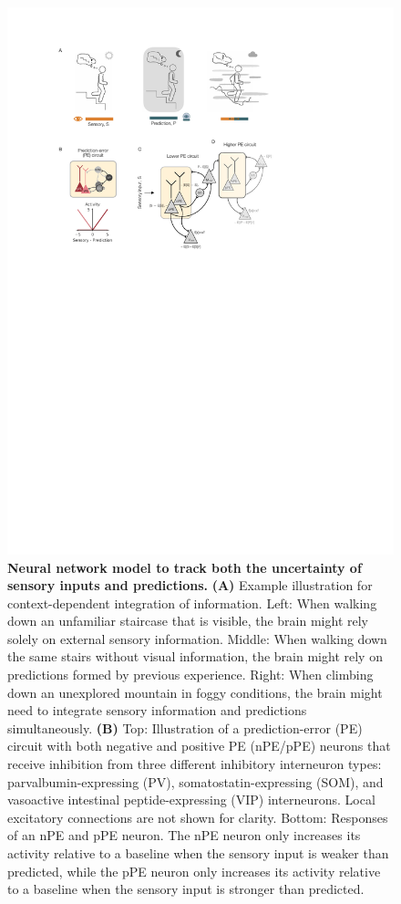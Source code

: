 \documentclass[10pt,a4paper]{article}
\begin{document}
%
\begin{figure}[t!]
	\centering
    \includegraphics{../results/figures/final/Fig_1}
\caption{\footnotesize{\bf Neural network model to track both the uncertainty of sensory inputs and predictions.\newline} 
{\bf (A)} Example illustration for context-dependent integration of information. Left: When walking down an unfamiliar staircase that is visible, the brain might rely solely on external sensory information. Middle: When walking down the same stairs without visual information, the brain might rely on predictions formed by previous experience. Right: When climbing down an unexplored mountain in foggy conditions, the brain might need to integrate sensory information and predictions simultaneously.
{\bf (B)} Top: Illustration of a prediction-error (PE) circuit with both negative and positive PE (nPE/pPE) neurons that receive inhibition from three different inhibitory interneuron types: parvalbumin-expressing (PV), somatostatin-expressing (SOM), and vasoactive intestinal peptide-expressing (VIP) interneurons. Local excitatory connections are not shown for clarity. Bottom: Responses of an nPE and pPE neuron. The nPE neuron only increases its activity relative to a baseline when the sensory input is weaker than predicted, while the pPE neuron only increases its activity relative to a baseline when the sensory input is stronger than predicted.
}
\end{figure}
\end{document}
